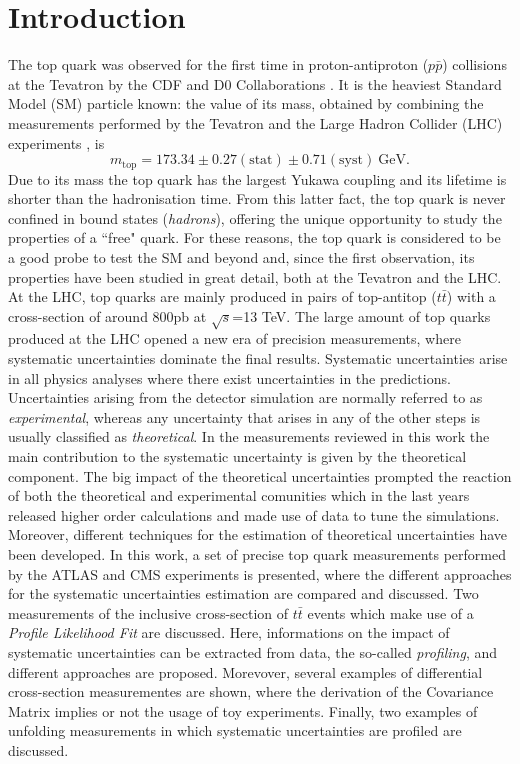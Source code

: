 \documentclass[12pt]{article}
\begin{document}
\section{Introduction}
The top quark was observed for the first time in proton-antiproton ($p\bar{p}$) collisions at the Tevatron by the CDF and D0 Collaborations 
\cite{Abe_1995,Abachi_1995}. It is the heaviest Standard Model (SM) particle known: the value of its mass, obtained by combining the measurements performed by the Tevatron and the Large Hadron Collider (LHC) experiments \cite{atlas2014combination}, is 
\begin{equation}
m_{\mathrm{top}} = 173.34 \pm 0.27(\mathrm{stat}) \pm 0.71(\mathrm{syst})~\mathrm{GeV}.
\end{equation}
Due to its mass the top quark has the largest Yukawa coupling and its lifetime is shorter than the hadronisation time. From this latter fact, the top quark is never confined in bound states (\emph{hadrons}), offering the unique opportunity to study the properties of a ``free" quark.
For these reasons, the top quark is considered to be a good probe to test the SM and beyond and, since the first observation, its properties have been studied in great detail, both at the Tevatron and the LHC.  
At the LHC, top quarks are mainly produced in pairs of top-antitop ($t\bar{t}$) with a cross-section of around 800pb at $\sqrt{s}$=13 TeV.
The large amount of top quarks produced at the LHC opened a new era of precision measurements, where systematic uncertainties dominate the final results. Systematic uncertainties arise in all physics analyses where there exist uncertainties in the predictions. Uncertainties arising from the detector simulation are normally referred to as \emph{experimental}, whereas any uncertainty that arises in any of the other steps is usually classified as \emph{theoretical}. In the measurements reviewed in this work the main contribution to the systematic uncertainty is given by the theoretical component.
The big impact of the theoretical uncertainties prompted the reaction of both the theoretical and experimental comunities which in the last years released higher order calculations and made use of data to tune the simulations.
Moreover, different techniques for the estimation of theoretical uncertainties have been developed. In this work, a set of precise top quark measurements performed by the ATLAS and CMS experiments is presented, where the different approaches for the systematic uncertainties estimation are compared and discussed.
Two measurements of the inclusive cross-section of $t\bar{t}$ events which make use of a \emph{Profile Likelihood Fit} are discussed. Here, informations on the impact of systematic uncertainties can be extracted from data, the so-called \emph{profiling}, and different approaches are proposed. Morevover, several examples of differential cross-section measurementes are shown, where the derivation of the Covariance Matrix implies or not the usage of toy experiments. Finally, two examples of unfolding measurements in which systematic uncertainties are profiled are discussed. 
\end{document}
